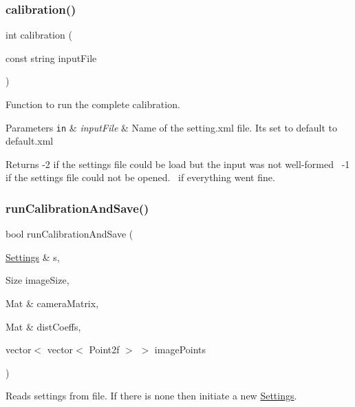 \subsubsection{\texorpdfstring{calibration()}{calibration()}}
{\footnotesize\ttfamily int calibration (\begin{DoxyParamCaption}\item[{const string}]{input\+File }\end{DoxyParamCaption})}



Function to run the complete calibration. 


\begin{DoxyParams}[1]{Parameters}
\mbox{\tt in}  & {\em input\+File} & Name of the setting.\+xml file. It\textquotesingle{}s set to default to default.\+xml\\
\hline
\end{DoxyParams}
\begin{DoxyReturn}{Returns}
-\/2 if the settings file could be load but the input was not well-\/formed~\newline
 -\/1 if the settings file could not be opened.~ if everything went fine. 
\end{DoxyReturn}
\mbox{\label{calibration_8hh_ac7558c8da6af683fc1c86c2ede7bb31c}} 
\subsubsection{\texorpdfstring{run\+Calibration\+And\+Save()}{runCalibrationAndSave()}}
{\footnotesize\ttfamily bool run\+Calibration\+And\+Save (\begin{DoxyParamCaption}\item[{\mbox{\hyperlink{class_settings}{Settings}} \&}]{s,  }\item[{Size}]{image\+Size,  }\item[{Mat \&}]{camera\+Matrix,  }\item[{Mat \&}]{dist\+Coeffs,  }\item[{vector$<$ vector$<$ Point2f $>$ $>$}]{image\+Points }\end{DoxyParamCaption})}



Reads settings from file. If there is none then initiate a new {\ttfamily \mbox{\hyperlink{class_settings}{Settings}}}. 


